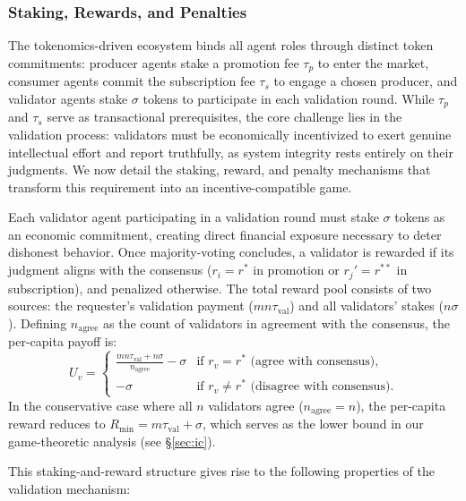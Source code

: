\subsubsection{Staking, Rewards, and Penalties}
\label{sec:staking}

The tokenomics-driven ecosystem binds all agent roles through distinct token commitments: producer agents stake a promotion fee $\tau_p$ to enter the market, consumer agents commit the subscription fee $\tau_s$ to engage a chosen producer, and validator agents stake $\sigma$ tokens to participate in each validation round. While $\tau_p$ and $\tau_s$ serve as transactional prerequisites, the core challenge lies in the validation process: validators must be economically incentivized to exert genuine intellectual effort and report truthfully, as system integrity rests entirely on their judgments. We now detail the staking, reward, and penalty mechanisms that transform this requirement into an incentive-compatible game.

Each validator agent participating in a validation round must stake $\sigma$ tokens as an economic commitment, creating direct financial exposure necessary to deter dishonest behavior. Once majority-voting concludes, a validator is rewarded if its judgment aligns with the consensus ($r_i = r^*$ in promotion or $r_j' = r^{**}$ in subscription), and penalized otherwise. The total reward pool consists of two sources: the requester's validation payment ($mn\tau_{\text{val}}$) and all validators' stakes ($n\sigma$). Defining $n_{\text{agree}}$ as the count of validators in agreement with the consensus, the per-capita payoff is:
\begin{equation}
\label{eq:validator_payoff_mechanism}
U_v =
\begin{cases}
\displaystyle\frac{mn\tau_{\text{val}} + n\sigma}{n_{\text{agree}}} - \sigma & \text{if } r_v = r^* \text{ (agree with consensus)}, \\[8pt]
-\sigma & \text{if } r_v \neq r^* \text{ (disagree with consensus)}.
\end{cases}
\end{equation}
In the conservative case where all $n$ validators agree ($n_{\text{agree}} = n$), the per-capita reward reduces to $R_{\min} = m\tau_{\text{val}} + \sigma$, which serves as the lower bound in our game-theoretic analysis (see \S\ref{sec:ic}).

This staking-and-reward structure gives rise to the following properties of the validation mechanism:

